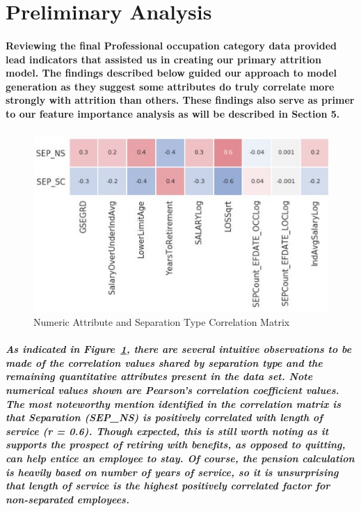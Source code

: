 \documentclass[10pt]{article}
\begin{document}
\section{Preliminary Analysis}

\paragraph{Reviewing the final Professional occupation category data provided lead indicators that assisted us in creating our primary attrition model. The findings described below guided our approach to model generation as they suggest some attributes do truly correlate more strongly with attrition than others. These findings also serve as primer to our feature importance analysis as will be described in Section 5.}
 
\subparagraph{}
\begin{figure}[H]
\centering
\includegraphics[width=\linewidth]{SEP_CorrMatrix.jpg}
\caption{Numeric Attribute and Separation Type Correlation Matrix}
\label{fig:SEP_CorrMatrix}
\end{figure}

\subparagraph{As indicated in Figure~\ref{fig:SEP_CorrMatrix}, there are several intuitive observations to be made of the correlation values shared by separation type and the remaining quantitative attributes present in the data set. Note numerical values shown are Pearson’s correlation coefficient values. The most noteworthy mention identified in the correlation matrix is that Separation (SEP\_NS) is positively correlated with length of service (r = 0.6). Though expected, this is still worth noting as it supports the prospect of retiring with benefits, as opposed to quitting, can help entice an employee to stay. Of course, the pension calculation is heavily based on number of years of service, so it is unsurprising that length of service is the highest positively correlated factor for non-separated employees.}
 
\end{document}
